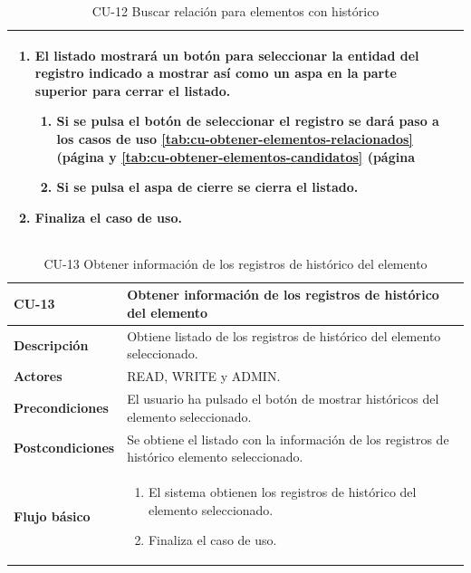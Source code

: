 \begin{table} [H]
{\begin{tabular}{| m{3cm} | m{11cm} |}
\begin{enumerate}
		\item El listado mostrará un botón para seleccionar la entidad del registro indicado a mostrar así como un aspa en la parte superior para cerrar el listado.
		       \begin{enumerate}	
			        \item Si se pulsa el botón de seleccionar el registro se dará paso a los casos de uso \ref{tab:cu-obtener-elementos-relacionados} (página \pageref{tab:cu-obtener-elementos-relacionados} y \ref{tab:cu-obtener-elementos-candidatos} (página \pageref{tab:cu-obtener-elementos-candidatos}
			        \item Si se pulsa el aspa de cierre se cierra el listado.
			\end{enumerate}
		\item Finaliza el caso de uso.				
	  \end{enumerate} 	  	  
	  \\\hline
    \end{tabular}
    } %
    \caption{CU-12 Buscar relación para elementos con histórico}
    \label{tab:cu-buscar-relacion-elementos-historico}
\end{table}




\begin{table} [H]
    \centering
    \setlength{\leftmargini}{0.4cm}
	\resizebox{14cm}{!} { %
    \begin{tabular}{| m{3cm} | m{11cm} |}   
    \hline
	  \textbf{CU-13} & \textbf{Obtener información de los registros de histórico del elemento} \\\hline
	  \textbf{Descripción} & Obtiene listado de los registros de histórico del elemento seleccionado. \\\hline
	  \textbf{Actores} & READ, WRITE y ADMIN. \\\hline
	  \textbf{Precondiciones} & El usuario ha pulsado el botón de mostrar históricos del elemento seleccionado. \\\hline
	  \textbf{Postcondiciones} & Se obtiene el listado con la información de los registros de histórico elemento seleccionado. \\\hline
	  \textbf{Flujo básico} & 
		\begin{enumerate}
	  	\item El sistema obtienen los registros de histórico del elemento seleccionado.
		\item Finaliza el caso de uso.				
	  \end{enumerate} 	  	  
	  \\\hline
    \end{tabular}
    } %
    \caption{CU-13 Obtener información de los registros de histórico del elemento}
    \label{tab:cu-obtener-historicos}
\end{table}


